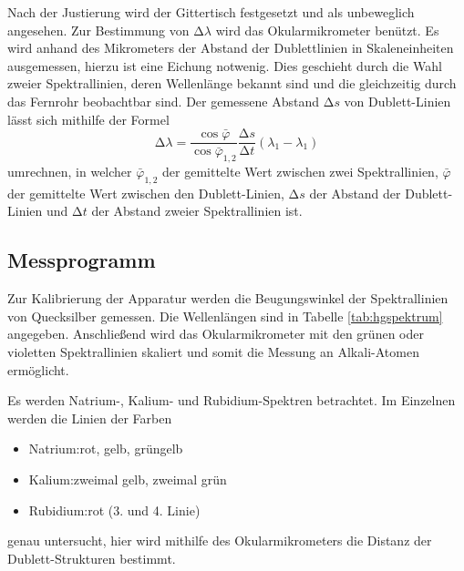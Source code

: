 Nach der Justierung wird der Gittertisch festgesetzt und als unbeweglich angesehen.
Zur Bestimmung von $\mathup{\Delta}\lambda$ wird das Okularmikrometer benützt.
Es wird anhand des Mikrometers der Abstand der Dublettlinien in Skaleneinheiten ausgemessen, hierzu ist eine Eichung notwenig.
Dies geschieht durch die Wahl zweier Spektrallinien, deren Wellenlänge bekannt sind und die gleichzeitig durch das Fernrohr beobachtbar sind.
Der gemessene Abstand $\mathup{\Delta}s$ von Dublett-Linien lässt sich mithilfe der Formel
\begin{equation}
	\mathup{\Delta}\lambda=\frac{\cos{\bar\varphi}}{\cos{\bar\varphi_{1,2}}}\frac{\mathup{\Delta}s}{\mathup{\Delta}t}(\lambda_1-\lambda_1)
\label{delta_lambda}
\end{equation}
umrechnen, in welcher $\bar\varphi_{1,2}$ der gemittelte Wert zwischen zwei Spektrallinien, $\bar\varphi$ der gemittelte Wert zwischen den Dublett-Linien, $\mathup{\Delta}s$ der Abstand der Dublett-Linien und $\mathup{\Delta}t$ der Abstand zweier Spektrallinien ist.

\subsection{Messprogramm}
Zur Kalibrierung der Apparatur werden die Beugungswinkel der Spektrallinien von Quecksilber gemessen.
Die Wellenlängen sind in Tabelle \ref{tab:hgspektrum} angegeben.
Anschließend wird das Okularmikrometer mit den grünen oder violetten Spektrallinien skaliert und somit die Messung an Alkali-Atomen ermöglicht.

Es werden Natrium-, Kalium- und Rubidium-Spektren betrachtet.
Im Einzelnen werden die Linien der Farben
\begin{itemize}
	\item{Natrium:\hspace{10pt}rot, gelb, grüngelb}
	\item{Kalium:\hspace{15pt}zweimal gelb, zweimal grün}
	\item{Rubidium:\hspace{3pt}rot (3. und 4. Linie)}
\end{itemize}
genau untersucht, hier wird mithilfe des Okularmikrometers die Distanz der Dublett-Strukturen bestimmt.
